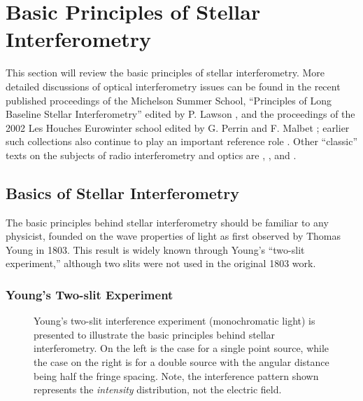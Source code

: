 \documentclass[12pt]{article}
\begin{document}

\section{Basic Principles of Stellar Interferometry}

This section will review the basic principles of stellar
interferometry.  More detailed discussions of optical interferometry
issues can be found in the recent published proceedings of the Michelson
Summer School, ``Principles of Long Baseline Stellar Interferometry''
edited by P. Lawson \citep{mss2000}, and the proceedings of the 2002 Les
Houches Eurowinter school edited by G. Perrin and F. Malbet
\citep{leshouches2002}; earlier such collections also continue to play an
important reference role \citep[e.g.,][]{nrao86, nato1997}.
Other ``classic'' texts on the
subjects of radio interferometry and optics are \citet{tms2001},
\citet{bw65}, and \citet{goodman1985}.

\subsection{Basics of Stellar Interferometry}
The basic principles behind stellar interferometry should be 
familiar to any physicist, founded on the wave properties of light
as first observed by Thomas Young in 1803.  This result is widely known
through Young's ``two-slit experiment,'' although two slits were not used in the
original 1803 work.

\subsubsection{Young's Two-slit Experiment}

\begin{figure}
\begin{center}
\centerline{}
\caption[Simple interferometer]{
  Young's two-slit interference experiment (monochromatic light) is
  presented to illustrate the basic principles behind stellar
  interferometry.  On the left is the case for a single point source,
  while the case on the right is for a double source with the angular
  distance being half the fringe spacing. Note, the interference
  pattern shown represents the {\em intensity} distribution, not the electric
  field.
\label{fig:2slit}}
\end{center}
\end{figure}
\end{document}
